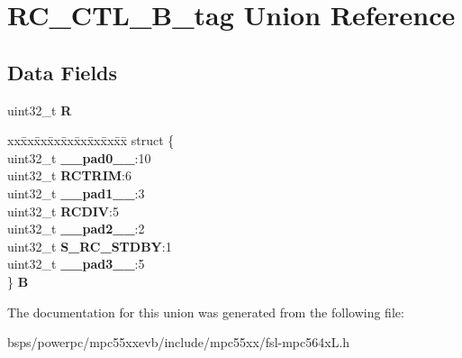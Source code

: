 \hypertarget{unionRC__CTL__32B__tag}{}\section{R\+C\+\_\+\+C\+T\+L\+\_\+B\+\_\+tag Union Reference}
\label{unionRC__CTL__32B__tag}
\subsection*{Data Fields}
\begin{DoxyCompactItemize}
\item 
\mbox{\label{unionRC__CTL__32B__tag_a72a60be7a6bbd39757973f41722f4a66}} 
uint32\+\_\+t {\bfseries R}
\item 
\mbox{\label{unionRC__CTL__32B__tag_afa85e017d9e68d9f6f241faa4586da0c}} 
\begin{tabbing}
xx\=xx\=xx\=xx\=xx\=xx\=xx\=xx\=xx\=\kill
struct \{\\
\>uint32\_t {\bfseries \_\_pad0\_\_}:10\\
\>uint32\_t {\bfseries RCTRIM}:6\\
\>uint32\_t {\bfseries \_\_pad1\_\_}:3\\
\>uint32\_t {\bfseries RCDIV}:5\\
\>uint32\_t {\bfseries \_\_pad2\_\_}:2\\
\>uint32\_t {\bfseries S\_RC\_STDBY}:1\\
\>uint32\_t {\bfseries \_\_pad3\_\_}:5\\
\} {\bfseries B}\\

\end{tabbing}\end{DoxyCompactItemize}


The documentation for this union was generated from the following file\+:\begin{DoxyCompactItemize}
\item 
bsps/powerpc/mpc55xxevb/include/mpc55xx/fsl-\/mpc564x\+L.\+h\end{DoxyCompactItemize}
